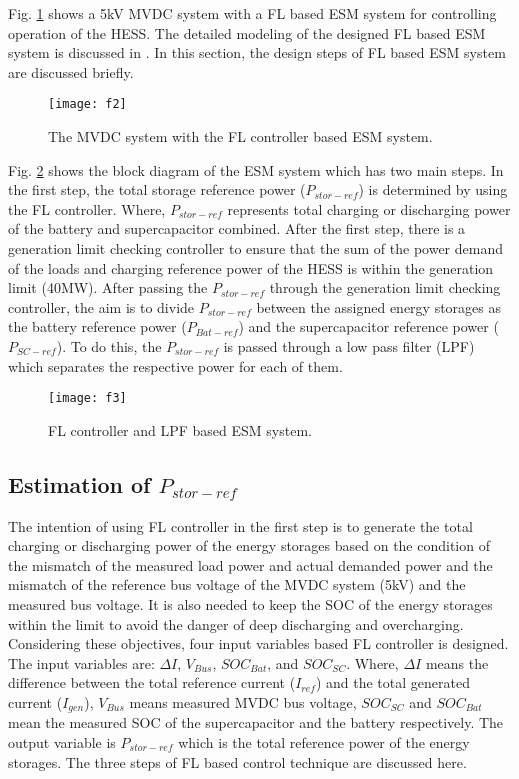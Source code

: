 Fig. \ref{sec3_f2} shows a 5kV MVDC system with a FL based ESM system for controlling operation of the HESS. The detailed modeling of the designed FL based ESM system is discussed in \cite{khan2017fuzzy}. In this section, the design steps of FL based ESM system are discussed briefly.
\begin{figure}[ht!]
\centering
\texttt{[image: f2]}
\caption{The MVDC system with the FL controller based ESM system.}
\label{sec3_f2}
\end{figure} 

Fig. \ref{sec3_f3} shows the block diagram of the ESM system which has two main steps. In the first step, the total storage reference power ($P_{stor-ref}$) is determined by using the FL controller. Where, $P_{stor-ref}$ represents total charging or discharging power of the battery and supercapacitor combined. After the first step, there is a generation limit checking controller to ensure that the sum of the power demand of the loads and charging reference power of the HESS is within the generation limit (40MW). After passing the $P_{stor-ref}$ through the generation limit checking controller, the aim is to divide $P_{stor-ref}$ between the assigned energy storages as the battery reference power ($P_{Bat-ref}$) and the supercapacitor reference power ($P_{SC-ref}$). To do this, the $P_{stor-ref}$ is passed through a low pass filter (LPF) which separates the respective power for each of them.
\begin{figure}[ht!]
\centering
\texttt{[image: f3]}
\caption{FL controller and LPF based ESM system.}
\label{sec3_f3}
\end{figure}
\subsection{Estimation of $P_{stor-ref}$}
The intention of using FL controller in the first step is to generate the total charging or discharging power of the energy storages based on the condition of the mismatch of the measured load power and actual demanded power and the mismatch of the reference bus voltage of the MVDC system (5kV) and the measured bus voltage. It is also needed to keep the SOC of the energy storages within the limit to avoid the danger of deep discharging and overcharging. Considering these objectives, four input variables based FL controller is designed. The input variables are: $\Delta I$, $V_{Bus}$, $SOC_{Bat}$, and $SOC_{SC}$. Where, $\Delta I$ means the difference between the total reference current ($I_{ref}$) and  the total generated current ($I_{gen}$), $V_{Bus}$ means measured MVDC bus voltage, $SOC_{SC}$ and $SOC_{Bat}$ mean the measured SOC of the supercapacitor and the battery respectively. The output variable is $P_{stor-ref}$ which is the total reference power of the energy storages. The three steps of FL based control technique are discussed here. 

